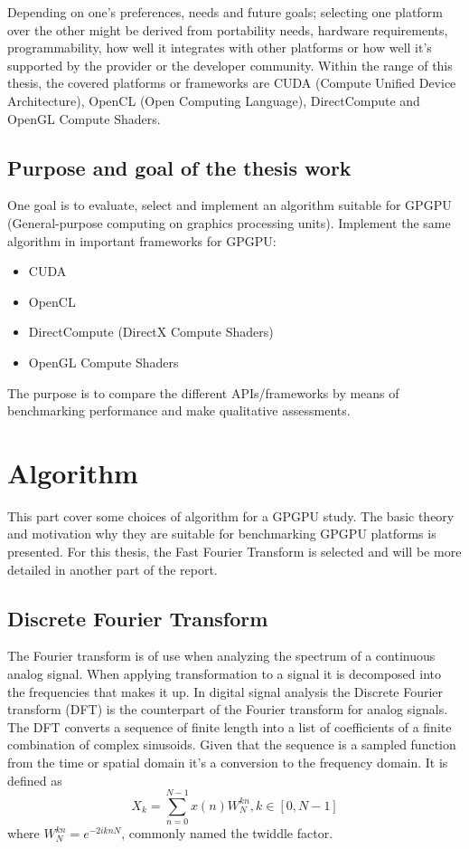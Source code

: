 Depending on one's preferences, needs and future goals; selecting one platform over the other might be derived from portability needs, hardware requirements, programmability, how well it integrates with other platforms or how well it's supported by the provider or the developer community. Within the range of this thesis, the covered platforms or frameworks are CUDA (Compute Unified Device Architecture), OpenCL (Open Computing Language), DirectCompute and OpenGL Compute Shaders.

\subsection{Purpose and goal of the thesis work}
One goal is to evaluate, select and implement an algorithm suitable for GPGPU (General-purpose computing on graphics processing units).
Implement the same algorithm in important frameworks for GPGPU:
\begin{itemize}
	\item CUDA
	\item OpenCL
	\item DirectCompute (DirectX Compute Shaders)
	\item OpenGL Compute Shaders
\end{itemize}

The purpose is to compare the different APIs/frameworks by means of benchmarking performance and make qualitative assessments.

\section{Algorithm}
This part cover some choices of algorithm for a GPGPU study. The basic theory and motivation why they are suitable for benchmarking GPGPU platforms is presented. For this thesis, the Fast Fourier Transform is selected and will be more detailed in another part of the report.

\newtheorem{thm}{Theorem}[chapter] %
\theoremstyle{definition}
\newtheorem{defn}[thm]{Definition} 

\subsection{Discrete Fourier Transform}
The Fourier transform is of use when analyzing the spectrum of a continuous analog signal. When applying transformation to a signal it is decomposed into the frequencies that makes it up. In digital signal analysis the Discrete Fourier transform (DFT) is the counterpart of the Fourier transform for analog signals. The DFT converts a sequence of finite length into a list of coefficients of a finite combination of complex sinusoids. Given that the sequence is a sampled function from the time or spatial domain it's a conversion to the frequency domain. It is defined as
\begin{equation}
	X_k=\sum_{n=0}^{N-1}x(n)W_N^{kn}, k \in {[0, N-1]}	
\end{equation}
	where $W_N^{kn}=e^{-2iknN}$, commonly named the twiddle factor\cite{Gentleman1966}.

